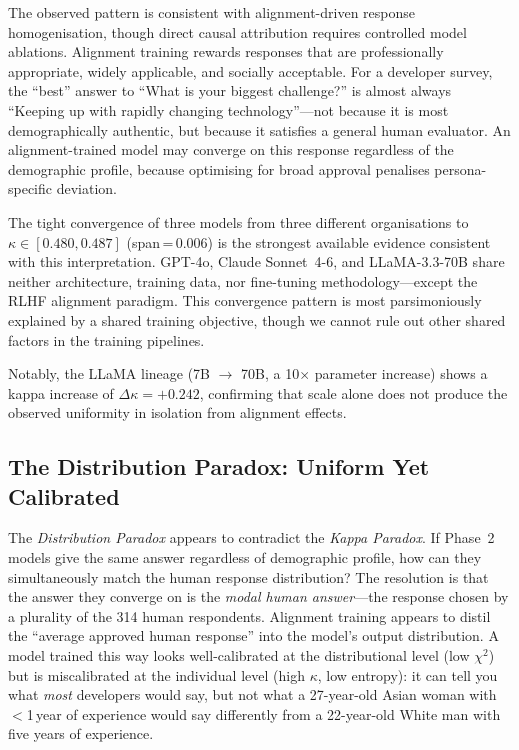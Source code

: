 \documentclass[12pt,a4paper]{article}
\newcommand{\kp}{\textit{Kappa Paradox}\xspace}
\newcommand{\distrpar}{\textit{Distribution Paradox}\xspace}
\begin{document}
The observed pattern is consistent with alignment-driven response
homogenisation, though direct causal attribution requires controlled
model ablations.
Alignment training rewards responses that are professionally
appropriate, widely applicable, and socially acceptable.
For a developer survey, the ``best'' answer to ``What is your biggest
challenge?'' is almost always ``Keeping up with rapidly changing
technology''---not because it is most demographically authentic, but
because it satisfies a general human evaluator.
An alignment-trained model may converge on this response regardless
of the demographic profile, because optimising for broad approval
penalises persona-specific deviation.

The tight convergence of three models from three different
organisations to $\kappa \in [0.480, 0.487]$ (span\,=\,0.006) is the
strongest available evidence consistent with this interpretation.
GPT-4o, Claude Sonnet~4-6, and LLaMA-3.3-70B share neither
architecture, training data, nor fine-tuning methodology---except
the RLHF alignment paradigm.
This convergence pattern is most parsimoniously explained by a shared
training objective, though we cannot rule out other shared factors
in the training pipelines.

Notably, the LLaMA lineage (7B $\rightarrow$ 70B, a 10$\times$
parameter increase) shows a kappa increase of $\Delta\kappa{=}+0.242$,
confirming that scale alone does not produce the observed uniformity
in isolation from alignment effects.

\subsection{The Distribution Paradox: Uniform Yet Calibrated}
\label{sec:disc:dist}

The \distrpar appears to contradict the \kp.
If Phase~2 models give the same answer regardless of demographic profile,
how can they simultaneously match the human response distribution?
The resolution is that the answer they converge on is the
\emph{modal human answer}---the response chosen by a plurality of the
314 human respondents.
Alignment training appears to distil the ``average approved human
response'' into the model's output distribution.
A model trained this way looks well-calibrated at the distributional
level (low $\chi^2$) but is miscalibrated at the individual level
(high $\kappa$, low entropy): it can tell you what \emph{most}
developers would say, but not what a 27-year-old Asian woman with
$<$1\,year of experience would say differently from a 22-year-old
White man with five years of experience.
\end{document}
